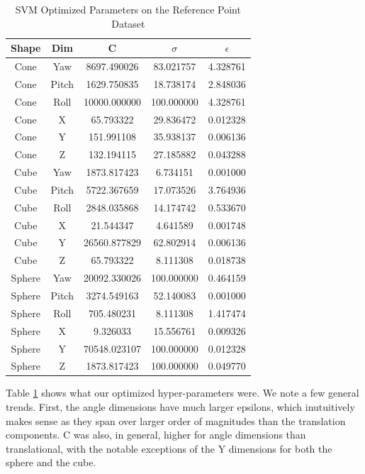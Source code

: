\documentclass[journal]{IEEEtran}
\begin{document}
\begin{table}[h]
\caption{SVM Optimized Parameters on the Reference Point Dataset}
\label{SVM_Point_Parms}
\centering

\begin{tabular}{|c|c|c|c|c|}
\hline
Shape & Dim & C & $\sigma$ & $\epsilon$\\
\hline
Cone & Yaw & 8697.490026 & 83.021757 & 4.328761\\
Cone & Pitch & 1629.750835 & 18.738174 & 2.848036\\
Cone & Roll & 10000.000000 & 100.000000 & 4.328761\\
Cone & X & 65.793322 & 29.836472 & 0.012328\\
Cone & Y & 151.991108 & 35.938137 & 0.006136\\
Cone & Z & 132.194115 & 27.185882 & 0.043288\\
\hline
Cube & Yaw & 1873.817423 & 6.734151 & 0.001000\\
Cube & Pitch & 5722.367659 & 17.073526 & 3.764936\\
Cube & Roll & 2848.035868 & 14.174742 & 0.533670\\
Cube & X & 21.544347 & 4.641589 & 0.001748\\
Cube & Y & 26560.877829 & 62.802914 & 0.006136\\
Cube & Z & 65.793322 & 8.111308 & 0.018738\\
\hline
Sphere &  Yaw & 20092.330026 & 100.000000 & 0.464159\\
Sphere &  Pitch & 3274.549163 & 52.140083 & 0.001000\\
Sphere &  Roll & 705.480231 & 8.111308 & 1.417474\\
Sphere &  X & 9.326033 & 15.556761 & 0.009326\\
Sphere &  Y & 70548.023107 & 100.000000 & 0.012328\\
Sphere &  Z & 1873.817423 & 100.000000 & 0.049770\\
\hline
\end{tabular}
\end{table}

Table \ref{SVM_Point_Parms} shows what our optimized hyper-parameters were. We note a few general trends. First, the angle dimensions have much larger epsilons, which inutuitively makes sense as they span over larger order of magnitudes than the translation components. C was also, in general, higher for angle dimensions than translational, with the notable exceptions of the Y dimensions for both the sphere and the cube.
\end{document}
